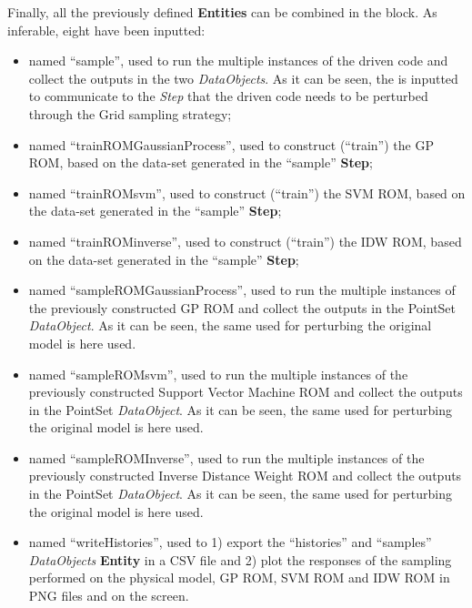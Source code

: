 \begin{enumerate}
   Finally, all the previously defined \textbf{Entities} can be combined in 
   the  block. As inferable, 
   eight  have been inputted:
   \begin{itemize}
     \item {} named ``sample'', used to run the multiple  
     instances of the driven code and 
     collect the outputs in the two \textit{DataObjects}. As it can be
     seen, the  is inputted to communicate to the 
     \textit{Step} that the driven code needs to
     be perturbed through the Grid sampling strategy;
     \item {} named ``trainROMGaussianProcess'', used to construct (``train'')
     the GP ROM, based on the data-set generated in the  ``sample'' \textbf{Step};
     \item {} named ``trainROMsvm'', used to construct (``train'')
     the SVM ROM, based on the data-set generated in the  ``sample'' \textbf{Step};
     \item {} named ``trainROMinverse'', used to construct (``train'')
     the IDW ROM, based on the data-set generated in the  ``sample'' \textbf{Step};
     \item {} named ``sampleROMGaussianProcess'', used to run the multiple  
     instances of the previously constructed GP ROM and 
     collect the outputs in the PointSet \textit{DataObject}. As it can be
     seen, the same  used for perturbing the original model is here used. 
     \item {} named ``sampleROMsvm'', used to run the multiple  
     instances of the previously constructed Support Vector Machine ROM and 
     collect the outputs in the PointSet \textit{DataObject}. As it can be
     seen, the same  used for perturbing the original model is here used.
     \item {} named ``sampleROMInverse'', used to run the multiple  
     instances of the previously constructed Inverse Distance Weight ROM and 
     collect the outputs in the PointSet \textit{DataObject}. As it can be
     seen, the same  used for perturbing the original model is here used.
     \item  {} named ``writeHistories'', used to 1) export 
     the ``histories'' and ``samples''  \textit{DataObjects} 
     \textbf{Entity} in a CSV file and 2) plot the responses of the sampling performed on the physical model, GP ROM,
     SVM ROM and IDW ROM in  PNG files and on the screen.
   \end{itemize}
\end{enumerate} 

